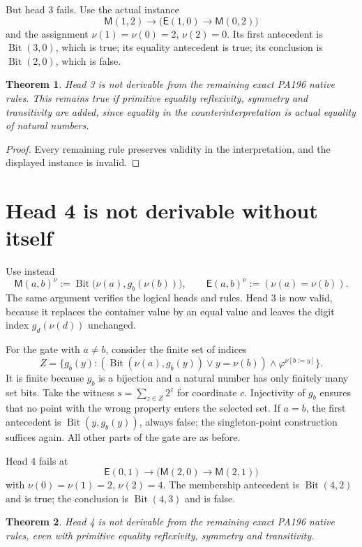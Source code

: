 \documentclass[10pt]{article}
\newtheorem{theorem}{Theorem}
\newcommand{\Bit}{\operatorname{Bit}}
\newcommand{\M}{\mathsf M}
\newcommand{\E}{\mathsf E}
\begin{document}
But head 3 fails.  Use the actual instance
\[
 \M(1,2)\to\bigl(\E(1,0)\to\M(0,2)\bigr)
\]
and the assignment $\nu(1)=\nu(0)=2$, $\nu(2)=0$.  Its first
antecedent is $\Bit(3,0)$, which is true; its equality antecedent is
true; its conclusion is $\Bit(2,0)$, which is false.

\begin{theorem}
Head 3 is not derivable from the remaining exact PA196 native rules.
This remains true if primitive equality reflexivity, symmetry and
transitivity are added, since equality in the counterinterpretation
is actual equality of natural numbers.
\end{theorem}
\begin{proof}
Every remaining rule preserves validity in the interpretation, and
the displayed instance is invalid.
\end{proof}

\section{Head 4 is not derivable without itself}

Use instead
\[
 \M(a,b)^\nu:=\Bit\bigl(\nu(a),g_b(\nu(b))\bigr),\qquad
 \E(a,b)^\nu:=(\nu(a)=\nu(b)).
\]
The same argument verifies the logical heads and rules.  Head 3 is
now valid, because it replaces the container value by an equal
value and leaves the digit index $g_d(\nu(d))$ unchanged.

For the gate with $a\ne b$, consider the finite set of indices
\[
 Z=\{g_b(y):(\Bit(\nu(a),g_b(y))\vee y=\nu(b))\wedge
                    \varphi^{\nu[b:=y]}\}.
\]
It is finite because $g_b$ is a bijection and a natural number has
only finitely many set bits.  Take the witness
$s=\sum_{z\in Z}2^z$ for coordinate $c$.  Injectivity of $g_b$
ensures that no point with the wrong property enters the selected
set.  If $a=b$, the first antecedent is $\Bit(y,g_b(y))$, always
false; the singleton-point construction suffices again.
All other parts of the gate are as before.

Head 4 fails at
\[
 \E(0,1)\to\bigl(\M(2,0)\to\M(2,1)\bigr)
\]
with $\nu(0)=\nu(1)=2$, $\nu(2)=4$.  The membership antecedent
is $\Bit(4,2)$ and is true; the conclusion is $\Bit(4,3)$ and is
false.

\begin{theorem}
Head 4 is not derivable from the remaining exact PA196 native rules,
even with primitive equality reflexivity, symmetry and transitivity.
\end{theorem}
\end{document}
